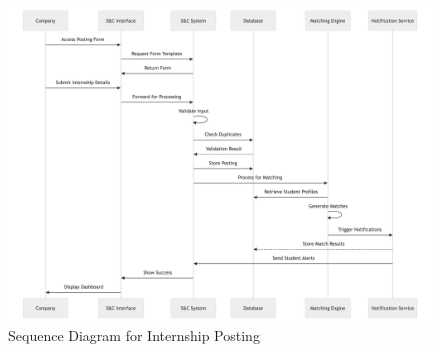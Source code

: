 \begin{figure}[H]
    \begin{center}
        \includegraphics[width=1\linewidth]{JhaBhatiaSharma/Images/Sequence Diagrams/InternshipPosting.png}
        \caption{Sequence Diagram for Internship Posting}
        \label{fig:InternPost}%
    \end{center}
\end{figure}

